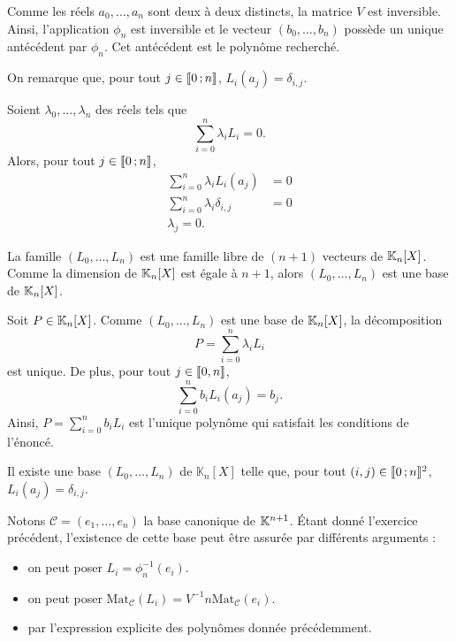 \begin{elemsolution}
\begin{reponses}
\begin{reponses}

\item Comme les réels $a_0,\ldots,a_n$ sont deux à deux distincts, la matrice $V$ est inversible. Ainsi, l'application $\phi_n$ est inversible et le vecteur $(b_0,\ldots,b_n)$ possède un unique antécédent par $\phi_n$. Cet antécédent est le polynôme recherché.
\end{reponses}

\item
\begin{reponses}
\item On remarque que, pour tout $j \in \llbracket 0\,; n \rrbracket$, $L_i(a_j) = \delta_{i,j}$.

\item Soient $\lambda_0,\ldots,\lambda_n$ des réels tels que
\[
\sum_{i=0}^n \lambda_i L_i = 0.
\]
Alors, pour tout $j \in \llbracket 0\,; n \rrbracket$,
\begin{align*}
\sum_{i=0}^n \lambda_i L_i(a_j) &= 0\\
\sum_{i=0}^n \lambda_i \delta_{i,j} &= 0\\
\lambda_j = 0.
\end{align*}

\item La famille $(L_0,\ldots,L_n)$ est une famille libre de $(n + 1)$ vecteurs de $\mathbb{K}_n[X]$. Comme la dimension de $\mathbb{K}_n[X]$ est égale à $n + 1$, alors $(L_0,\ldots,L_n)$ est une base de $\mathbb{K}_n[X]$.

\item Soit $P \in \mathbb{K}_n[X]$. Comme $(L_0,\ldots,L_n)$ est une base de $\mathbb{K}_n[X]$, la décomposition
\[
P = \sum_{i=0}^n \lambda_i L_i
\]
est unique. De plus, pour tout $j \in \llbracket0,n\rrbracket$,
\[
\sum_{i=0}^n b_i L_i(a_j) = b_j.
\]
Ainsi, $P = \sum_{i=0}^n b_i L_i$ est l'unique polynôme qui satisfait les conditions de l'énoncé.
\end{reponses}
\end{reponses}
\end{elemsolution}

\begin{defi}
Il existe une base $(L_0,\ldots,L_n)$ de $\mathbb{K}_n[X]$ telle que, pour tout $(i, j) \in \llbracket 0\,; n \rrbracket^2$, $L_i(a_j) = \delta_{i,j}$.
\end{defi}

\begin{demo}
Notons $\mathscr{C} = (e_1,\ldots,e_n)$ la base canonique de $\mathbb{K}^{n+1}$. Étant donné l'exercice précédent, l'existence de cette base peut être assurée par différents arguments :
\begin{itemize}
\item on peut poser $L_i = \phi_n^{-1}(e_i)$.

\item on peut poser $\mathrm{Mat}_{\mathscr{C}}(L_i) = V^{-1}n \textrm{Mat}_{\mathscr{C}}(e_i)$.

\item par l'expression explicite des polynômes donnée précédemment.
\end{itemize}
\end{demo}


